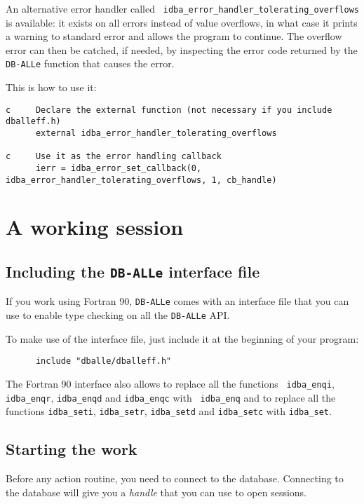 \documentclass[final,12pt,a4paper,twoside]{book}
\newcommand{\dballe}{{\tt DB-ALLe}}
\begin{document}
An alternative error handler called {\tt
idba\_error\_handler\_tolerating\_overflows} is available: it exists on all
errors instead of value overflows, in what case it prints a warning to standard
error and allows the program to continue.  The overflow error can then be
catched, if needed, by inspecting the error code returned by the \dballe{}
function that causes the error.

This is how to use it:

\begin{verbatim}
c     Declare the external function (not necessary if you include dballeff.h)
      external idba_error_handler_tolerating_overflows

c     Use it as the error handling callback
      ierr = idba_error_set_callback(0, idba_error_handler_tolerating_overflows, 1, cb_handle)
\end{verbatim}


\chapter {A working session}
\label{ch-work}

\section{Including the \dballe{} interface file}

If you work using Fortran 90, \dballe{} comes with an interface file that you
can use to enable type checking on all the \dballe{} API.

To make use of the interface file, just include it at the beginning of your
program:

\begin{verbatim}
      include "dballe/dballeff.h"
\end{verbatim}

The Fortran 90 interface also allows to replace all the functions {\tt
idba\_enqi}, {\tt idba\_enqr}, {\tt idba\_enqd} and {\tt idba\_enqc} with {\tt
idba\_enq} and to replace all the functions {\tt idba\_seti}, {\tt idba\_setr},
{\tt idba\_setd} and {\tt idba\_setc} with {\tt idba\_set}.

\section{Starting the work}

Before any action routine, you need to connect to the database.  Connecting to
the database will give you a \emph{handle} that you can use to open sessions.
\end{document}
